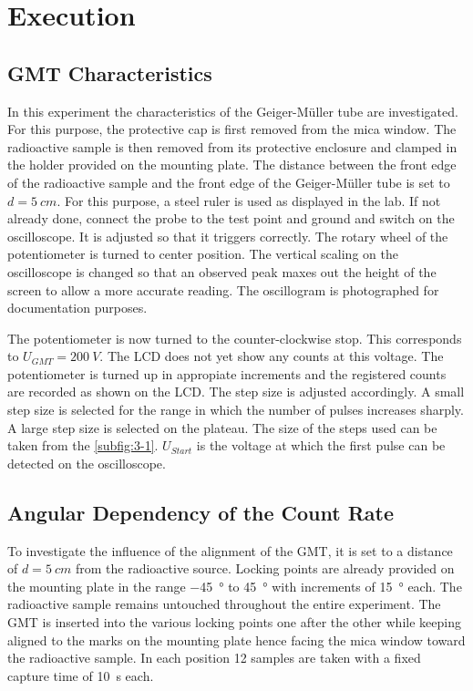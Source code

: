 \chapter{Execution}
\section{GMT Characteristics}
In this experiment the characteristics of the Geiger-Müller tube are investigated. For this purpose, the protective cap
is first removed from the mica window. The radioactive sample is then removed from its protective enclosure and clamped
in the holder provided on the mounting plate. The distance between the front edge of the radioactive sample and the front edge
of the Geiger-Müller tube is set to \(d = \SI[]{5}[]{cm}\). For this purpose, a steel ruler is used as displayed in the
lab. If not already done, connect the probe to the test point and ground and switch on the oscilloscope. It is
adjusted so that it triggers correctly. The rotary wheel of the potentiometer is turned to center position. The vertical
scaling on the oscilloscope is changed so that an observed peak maxes out the height of the screen to allow a more
accurate reading. The oscillogram is photographed for documentation purposes.\par
The potentiometer is now turned to the counter-clockwise stop. This corresponds to \(U_{GMT} = \SI[]{200}[]{V}\). The LCD
does not yet show any counts at this voltage. The potentiometer is turned up in appropiate increments and the registered
counts are recorded as shown on the LCD. The step size is adjusted accordingly. A small step size is selected for the
range in which the number of pulses increases sharply. A large step size is selected on the plateau. The size of the
steps used can be taken from the \cref{subfig:3-1}. \(U_{Start}\) is the voltage at which the first pulse can be detected %
on the oscilloscope.
%
\section{Angular Dependency of the Count Rate}
To investigate the influence of the alignment of the GMT, it is set to a distance of \(d = \SI{5}{cm}\) from the
radioactive source. Locking points are already provided on the mounting plate in the range \SI[]{-45}[]{\degree} to
\SI[]{+45}[]{\degree} with increments of \SI[]{15}[]{\degree} each. The radioactive sample remains untouched throughout
the entire experiment. The GMT is inserted into the various locking points one after the other while keeping aligned to
the marks on the mounting plate hence facing the mica window toward the radioactive sample. In each position 12 samples
are taken with a fixed capture time of \SI[]{10}[]{s} each.
%
